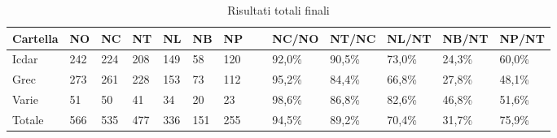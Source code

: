 		\begin{table}\label{tab:icdar}
	\begin{center}
	\begin{tabular}{|l|l|l|l|l|l|l|l|l|l|l|l|l|} \hline
	Cartella & NO & NC & NT & NL & NB & NP & ~ & NC/NO & NT/NC & NL/NT & NB/NT & NP/NT \\ \hline
	Icdar & 242 & 224 & 208 & 149 & 58 & 120 & ~ & 92,0\% & 90,5\% & 73,0\% & 24,3\% & 60,0\%\\ 
	Grec & 273 & 261 & 228 & 153 & 73 & 112 & ~ & 95,2\% & 84,4\% & 66,8\% & 27,8\% & 48,1\%\\
	Varie & 51 & 50 & 41 & 34 & 20 & 23 & ~ & 98,6\% & 86,8\% & 82,6\% & 46,8\% & 51,6\%\\ \hline
	Totale & 566 &	535	 & 477 &	336 &	151 & 	255 & ~ & 94,5\% & 89,2\% &	70,4\% & 31,7\% & 75,9\% \\ \hline

	\end{tabular}
	\tiny{\caption{Risultati totali finali}}
	\end{center}
	\end{table}
	

